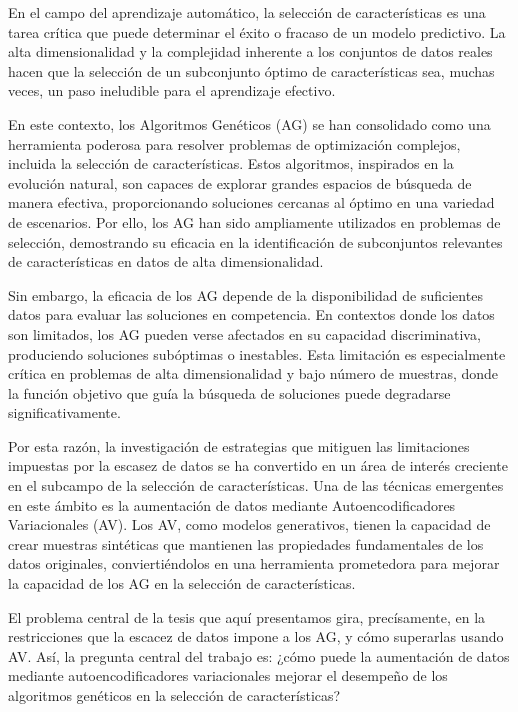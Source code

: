 
En el campo del aprendizaje automático, la selección de características es una tarea crítica que puede determinar el éxito o fracaso de un modelo predictivo. La alta dimensionalidad y la complejidad inherente a los conjuntos de datos reales hacen que la selección de un subconjunto óptimo de características sea, muchas veces, un paso ineludible para el aprendizaje efectivo.

En este contexto, los Algoritmos Genéticos (AG) se han consolidado como una herramienta poderosa para resolver problemas de optimización complejos, incluida la selección de características. Estos algoritmos, inspirados en la evolución natural, son capaces de explorar grandes espacios de búsqueda de manera efectiva, proporcionando soluciones cercanas al óptimo en una variedad de escenarios. Por ello, los AG han sido ampliamente utilizados en problemas de selección, demostrando su eficacia en la identificación de subconjuntos relevantes de características en datos de alta dimensionalidad.

Sin embargo, la eficacia de los AG depende de la disponibilidad de suficientes datos para evaluar las soluciones en competencia. En contextos donde los datos son limitados, los AG pueden verse afectados en su capacidad discriminativa, produciendo soluciones subóptimas o inestables. Esta limitación es especialmente crítica en problemas de alta dimensionalidad y bajo número de muestras, donde la función objetivo que guía la búsqueda de soluciones puede degradarse significativamente.

Por esta razón, la investigación de estrategias que mitiguen las limitaciones impuestas por la escasez de datos se ha convertido en un área de interés creciente en el subcampo de la selección de características. Una de las técnicas emergentes en este ámbito es la aumentación de datos mediante Autoencodificadores Variacionales (AV). Los AV, como modelos generativos, tienen la capacidad de crear muestras sintéticas que mantienen las propiedades fundamentales de los datos originales, conviertiéndolos en una herramienta prometedora para mejorar la capacidad de los AG en la selección de características.

El problema central de la tesis que aquí presentamos gira, precísamente, en la restricciones que la escacez de datos impone a los AG, y cómo superarlas usando AV. Así, la pregunta central del trabajo es: ¿cómo puede la aumentación de datos mediante autoencodificadores variacionales mejorar el desempeño de los algoritmos genéticos en la selección de características?

